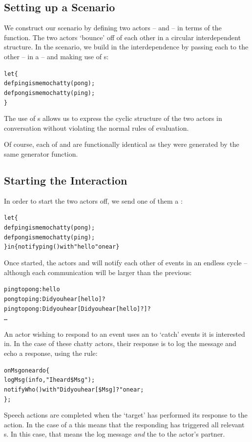 \subsection{Setting up a Scenario}
We construct our scenario by defining two actors --  and  -- in terms of the  function. The two actors `bounce' off of each other in a circular interdependent structure. In the scenario, we build in the interdependence by passing each  to the other -- in a  -- and making use of s:
\begin{alltt}
let\{
  def ping is memo chatty(pong);
  def pong is memo chatty(ping);
\}
\end{alltt}
\begin{aside}
The use of s allows us to express the cyclic structure of the two actors in conversation without violating the normal rules of evaluation.
\end{aside}
Of course, each of  and  are functionally identical as they were generated by the same generator function.

\subsection{Starting the Interaction}
In order to start the two actors off, we send one of them a  :
\begin{alltt}
let\{
  def ping is memo chatty(pong);
  def pong is memo chatty(ping);
\} in \{ notify ping() with "hello" on ear \}
\end{alltt}

Once started, the actors  and  will notify each other of events in an endless cycle -- although each communication will be larger than the previous:
\begin{alltt}
ping {\rm{}to} pong: hello
pong {\rm{}to} ping: Did you hear [hello]?
ping {\rm{}to} pong: Did you hear [Did you hear [hello]?]?
\ldots
\end{alltt}

An actor wishing to respond to an event uses an  to `catch' events it is interested in. In the case of these chatty actors, their response is to log the message and echo a response, using the rule:
\begin{alltt}
on Msg on ear do\{
   logMsg(info,"I heard \$Msg");
   notify Who() with "Did you hear [\$Msg]?" on ear;
\};
\end{alltt}
Speech actions are completed when the `target'  has performed its response to the action. In the case of a  this means that the responding  has triggered all relevant s. In this case, that means the log message \emph{and} the  to the actor's partner.

